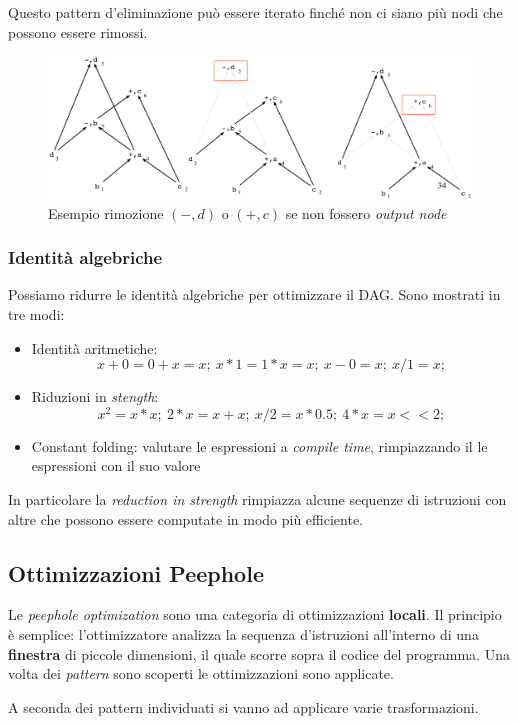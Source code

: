 Questo pattern d'eliminazione pu\`o essere iterato finch\'e non ci siano pi\`u
nodi che possono essere rimossi.

\begin{figure}[H]
  \centering
  \includegraphics[scale=0.4]{res/image/remove_dead_code}
  \caption{
    Esempio rimozione $(-,d)$ o $(+,c)$ se non fossero \textit{output node}
  }
  \label{img:remove_dead_code}
\end{figure}

\subsubsection{Identit\`a algebriche}
Possiamo ridurre le identit\`a algebriche per ottimizzare il DAG. Sono mostrati
in tre modi:
\begin{itemize}
\item Identit\`a aritmetiche:
$$x+0=0+x=x; \ x*1=1*x=x; \ x-0=x; \ x/1=x;$$
\item Riduzioni in \textit{stength}:
$$x^2=x*x; \ 2*x=x+x; \ x/2=x*0.5; \ 4*x=x<<2;$$
\item Constant folding:
valutare le espressioni a \textit{compile time}, rimpiazzando il le espressioni
con il suo valore
\end{itemize}

In particolare la \textit{reduction in strength} rimpiazza alcune sequenze di
istruzioni con altre che possono essere computate in modo pi\`u efficiente.

\subsection{Ottimizzazioni Peephole}
Le \textit{peephole optimization} sono una categoria di ottimizzazioni
\textbf{locali}. Il principio \`e semplice: l'ottimizzatore analizza la
sequenza d'istruzioni all'interno di una \textbf{finestra} di piccole
dimensioni, il quale scorre sopra il codice del programma. Una volta dei
\textit{pattern} sono scoperti le ottimizzazioni sono applicate.

A seconda dei pattern individuati si vanno ad applicare varie trasformazioni.

